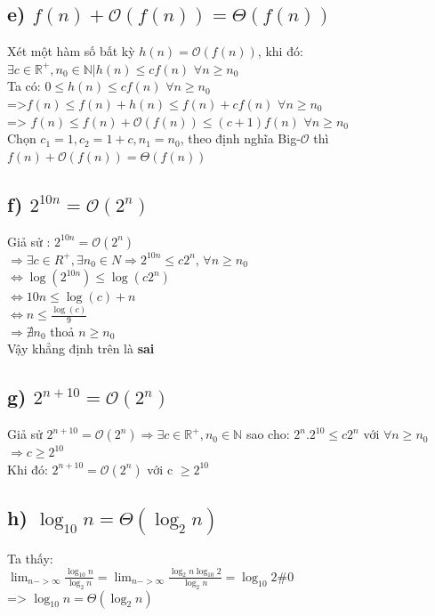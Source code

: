 \documentclass[10pt,a4paper]{article}
\begin{document}
\subsection*{e) $f(n) + \mathcal{O}(f(n)) = \Theta(f(n))$}
Xét một hàm số bất kỳ $h(n) = \mathcal{O}(f(n))$, khi đó:
$\exists c \in \mathbb{R^+},n_0 \in \mathbb{N} | h(n) \leq cf(n)$ $\forall n \geq n_0$\\
Ta có: 
{$0 \leq h(n) \leq cf(n)$} $\forall n \geq n_0$\\
{=>$f(n) \leq f(n) + h(n) \leq f(n) + cf(n)$} $\forall n \geq n_0$\\
{=> $f(n) \leq f(n) + \mathcal{O}(f(n)) \leq (c+1)f(n)$} $\forall n \geq n_0$\\
Chọn $c_1 = 1,c_2 = 1+c,n_1 = n_0$, theo định nghĩa Big-$\mathcal{O}$ thì $f(n) + \mathcal{O}(f(n)) = \Theta(f(n))$\\
\subsection*{f) $2^{10n}=\mathcal{O}(2^n)$}
Giả sử :  $2^{10n}=\mathcal{O}(2^n)$\\
$\Rightarrow  \exists c \in R^+,\exists n_0 \in N \Rightarrow 2^{10n} \leq c2^n$, $\forall n \geq n_0$ \\
$\Leftrightarrow \log(2^{10n}) \leq \log(c2^{n})$\\
$\Leftrightarrow 10n \leq \log(c) + n$\\
$\Leftrightarrow n \leq \frac{\log(c)}{9}$\\
$\Rightarrow \nexists n_0 $ thoả $n\geq n_0$ \\
Vậy khẳng định trên là \textbf{sai}\\
\subsection*{g) $2^{n + 10} = \mathcal{O}(2^n)$}
Giả sử $2^{n + 10} = \mathcal{O}(2^n) \Rightarrow \exists c \in \mathbb{R^+},n_0 \in \mathbb{N}$ sao cho: $2^n.2^{10} \leq c2^n$ với $\forall n \geq n_0$ $\Rightarrow c \geq 2^{10}$ \\
Khi đó:  $2^{n + 10} = \mathcal{O}(2^n)$ với c $\geq 2^{10}$\\
\subsection*{h) $\log_{10}{n} = \Theta(\log_2{n})$}
Ta thấy:\\
$\lim_{n->\infty}\frac{\log_{10}{n}}{\log_2{n}}=\lim_{n->\infty}\frac{\log_2{n} \log_{10}{2}}{\log_2{n}} = \log_{10}2 \# 0$\\
=> $\log_{10}{n} = \Theta(\log_2{n})$ \\
\end{document}
